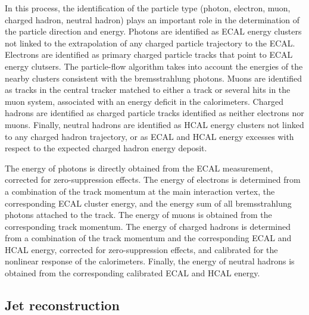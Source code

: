 In this process, the identification of the particle type (photon, electron, muon, charged hadron, neutral hadron) plays an important role in the determination of the particle direction and energy. Photons are identified as ECAL energy clusters not linked to the extrapolation of any charged particle trajectory to the ECAL. Electrons are identified as  primary charged particle tracks that point to ECAL energy clutsers. The particle-flow algorithm takes into account the energies of
 the nearby clusters consistent with the bremsstrahlung photons.
Muons are identified as tracks in the central tracker matched to either a track or several hits in the muon system, associated with an energy deficit in the calorimeters. Charged hadrons are identified as charged particle tracks identified as neither electrons nor muons. Finally, neutral hadrons are identified as HCAL energy clusters not linked to any charged hadron trajectory, or as ECAL and HCAL energy excesses with respect to the expected charged hadron energy deposit. 

The energy of photons is directly obtained from the ECAL measurement, corrected for zero-suppression effects. The energy of electrons is determined from a combination of the track momentum at the main interaction vertex, the corresponding ECAL cluster energy, and the energy sum of all bremsstrahlung photons attached to the track. The energy of muons is obtained from the corresponding track momentum. The energy of charged hadrons is determined from a combination of the track momentum and the corresponding ECAL and HCAL energy, corrected for zero-suppression effects, and calibrated for the nonlinear response of the calorimeters. Finally, the energy of neutral hadrons is obtained from the corresponding calibrated ECAL and HCAL energy. 

\subsection{Jet reconstruction}

